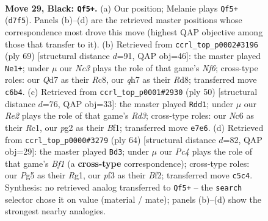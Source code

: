 \documentclass[11pt]{article}
\begin{document}
\clearpage

\begin{figure}[p]\centering
\begin{subfigure}{0.46\textwidth}\centering
\resizebox{\linewidth}{!}{%
\newchessgame
\chessboard[
  setfen={1rb2k2/3qrP1Q/ppn5/2p1p1p1/P7/2P2P2/6PP/1KN1RBNR b - - 0 29},
  showmover=false,
  pgfstyle=straightmove, color=movearrow, markmove={d7-f5}
]}
\caption{}
\end{subfigure}\hfill
\begin{subfigure}{0.46\textwidth}\centering
\resizebox{\linewidth}{!}{%
\newchessgame
\chessboard[
  setfen={2rr1b2/p4p1k/2q1p2p/2P2p1N/1P1p4/PN3n1P/1Q3P2/1R1R1B1K b - - 11 35},
  showmover=false,
  pgfstyle=straightmove, color=movearrow, markmove={f3-e1}
]}
\caption{}
\end{subfigure}
\\[4pt]
\begin{subfigure}{0.46\textwidth}\centering
\resizebox{\linewidth}{!}{%
\newchessgame
\chessboard[
  setfen={b2r2k1/3nqp2/pr4p1/2pp3p/7P/PPQRPN2/5PP1/2R2BK1 w - - 5 26},
  showmover=false,
  pgfstyle=straightmove, color=movearrow, markmove={d3-d1}
]}
\caption{}
\end{subfigure}\hfill
\begin{subfigure}{0.46\textwidth}\centering
\resizebox{\linewidth}{!}{%
\newchessgame
\chessboard[
  setfen={3r1nnk/p1r2qb1/1pp3pp/8/1P1PQP2/P1N2R2/5B1P/5BRK w - - 5 33},
  showmover=false,
  pgfstyle=straightmove, color=movearrow, markmove={f1-d3}
]}
\caption{}
\end{subfigure}
\caption{\textbf{Move 29, Black: \texttt{Qf5+}.} (a) Our position; Melanie plays \texttt{Qf5+} (\texttt{d7f5}). Panels (b)--(d) are the retrieved master positions whose correspondence most drove this move (highest QAP objective among those that transfer to it). (b) Retrieved from \texttt{ccrl\_top\_p0002\#3196} (ply 69) [structural distance $d$=91, QAP obj=46]: the master played \texttt{Ne1+}; under $\mu$ our \emph{Nc3} plays the role of that game's \emph{Nf6}; cross-type roles: our \emph{Q}d7 as their \emph{R}c8, our \emph{q}h7 as their \emph{R}d8; transferred move \texttt{c6b4}. (c) Retrieved from \texttt{ccrl\_top\_p0001\#2930} (ply 50) [structural distance $d$=76, QAP obj=33]: the master played \texttt{Rdd1}; under $\mu$ our \emph{Re2} plays the role of that game's \emph{Rd3}; cross-type roles: our \emph{N}c6 as their \emph{R}c1, our \emph{p}g2 as their \emph{B}f1; transferred move \texttt{e7e6}. (d) Retrieved from \texttt{ccrl\_top\_p0000\#3279} (ply 64) [structural distance $d$=82, QAP obj=29]: the master played \texttt{Bd3}; under $\mu$ our \emph{Pc4} plays the role of that game's \emph{Bf1} (a \textbf{cross-type} correspondence); cross-type roles: our \emph{P}g5 as their \emph{R}g1, our \emph{p}f3 as their \emph{B}f2; transferred move \texttt{c5c4}. Synthesis: no retrieved analog transferred to \texttt{Qf5+} -- the \texttt{search} selector chose it on value (material / mate); panels (b)--(d) show the strongest nearby analogies.}
\label{fig:thought-m57}
\end{figure}
\end{document}
